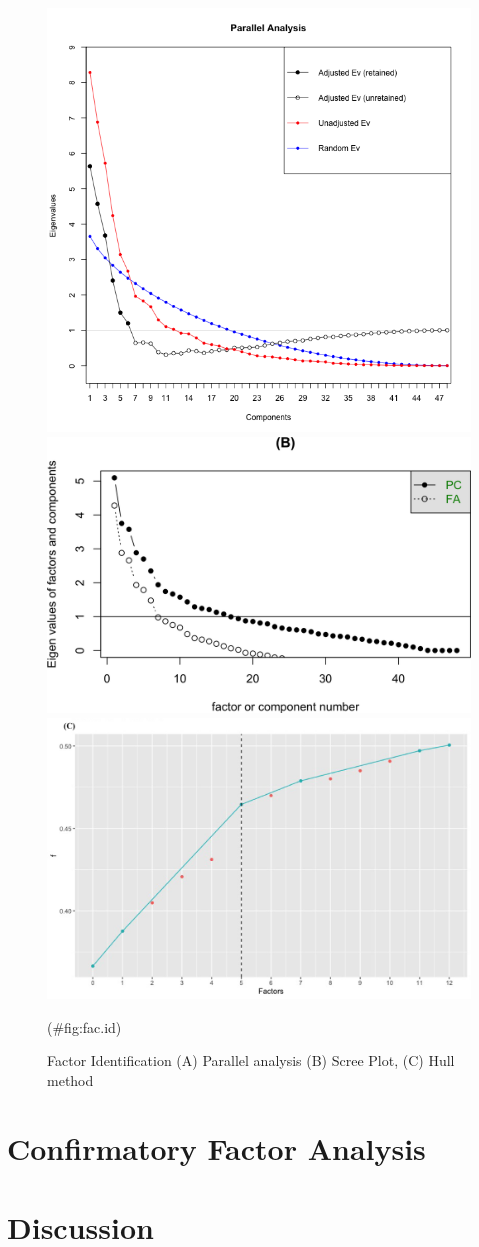 \documentclass[
  english,
  man]{apa6}
\begin{document}
\begin{figure}

{\centering \includegraphics[width=0.5\linewidth,height=0.5\textheight]{parallel} \includegraphics[width=0.5\linewidth,height=0.5\textheight]{manuscript_files/figure-latex/fac.id-2} \includegraphics[width=0.5\linewidth,height=0.5\textheight]{HUll method} 

}

\caption{Factor Identification (A) Parallel analysis (B) Scree Plot, (C) Hull method}(\#fig:fac.id)
\end{figure}

\hypertarget{confirmatory-factor-analysis}{%
\section{Confirmatory Factor Analysis}\label{confirmatory-factor-analysis}}

\hypertarget{discussion}{%
\section{Discussion}\label{discussion}}
\end{document}
